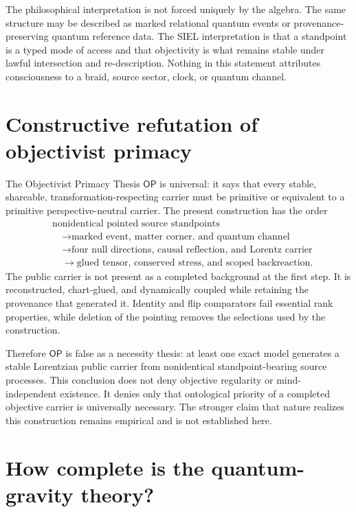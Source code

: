 \documentclass[11pt]{article}
\theoremstyle{definition}
\theoremstyle{remark}
\newcommand{\OPT}{\mathsf{OP}}
\begin{document}
The philosophical interpretation is not forced uniquely by the algebra. The same structure may be described as marked relational quantum events or provenance-preserving quantum reference data. The SIEL interpretation is that a standpoint is a typed mode of access and that objectivity is what remains stable under lawful intersection and re-description. Nothing in this statement attributes consciousness to a braid, source sector, clock, or quantum channel.

\section{Constructive refutation of objectivist primacy}

The Objectivist Primacy Thesis $\OPT$ is universal: it says that every stable, shareable, transformation-respecting carrier must be primitive or equivalent to a primitive perspective-neutral carrier. The present construction has the order
\begin{equation}
 \begin{aligned}
 &\text{nonidentical pointed source standpoints}\\
 &\quad\longrightarrow\text{marked event, matter corner, and quantum channel}\\
 &\quad\longrightarrow\text{four null directions, causal reflection, and Lorentz carrier}\\
 &\quad\longrightarrow\text{glued tensor, conserved stress, and scoped backreaction}.
 \end{aligned}
\end{equation}
The public carrier is not present as a completed background at the first step. It is reconstructed, chart-glued, and dynamically coupled while retaining the provenance that generated it. Identity and flip comparators fail essential rank properties, while deletion of the pointing removes the selections used by the construction.

Therefore $\OPT$ is false as a necessity thesis: at least one exact model generates a stable Lorentzian public carrier from nonidentical standpoint-bearing source processes. This conclusion does not deny objective regularity or mind-independent existence. It denies only that ontological priority of a completed objective carrier is universally necessary. The stronger claim that nature realizes this construction remains empirical and is not established here.

\section{How complete is the quantum-gravity theory?}
\end{document}
